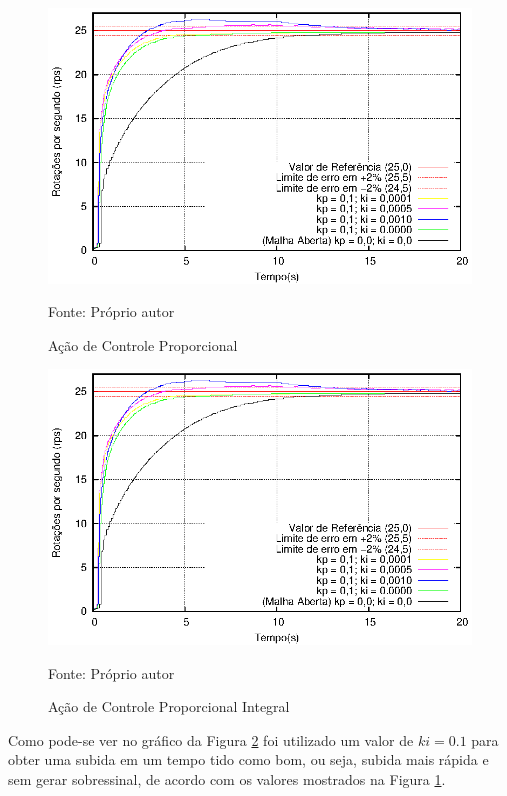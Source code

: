\begin{figure}[!htb]
\centering
\caption{Ação de Controle Proporcional}
\center\includegraphics[scale=1.4]{./imagens/acaoPI.eps}
\label{fig:acaoP}

{\small Fonte: Próprio autor}
\end{figure}













\begin{figure}[!htb]
\caption{Ação de Controle Proporcional Integral}
\center\includegraphics[scale=1.2]{./imagens/acaoPI.eps}
\label{fig:acaoPI}

{\small Fonte: Próprio autor}
\end{figure}

Como pode-se ver no gráfico da Figura \ref{fig:acaoPI} foi utilizado um valor de $ki = 0.1$ para obter uma subida em um tempo tido como bom, ou seja, subida mais rápida e sem gerar sobressinal, de acordo com os valores mostrados na Figura \ref{fig:acaoP}.





